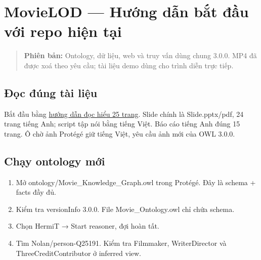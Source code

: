 \documentclass[
  11pt,
]{article}
\author{}
\date{}
\providecommand{\tightlist}{%
  \setlength{\itemsep}{0pt}\setlength{\parskip}{0pt}}
\begin{document}
\section{MovieLOD --- Hướng dẫn bắt đầu với repo hiện
tại}\label{movielod-hux1b0ux1edbng-dux1eabn-bux1eaft-ux111ux1ea7u-vux1edbi-repo-hiux1ec7n-tux1ea1i}

\begin{quote}
\textbf{Phiên bản:} Ontology, dữ liệu, web và truy vấn dùng chung 3.0.0.
MP4 đã được xoá theo yêu cầu; tài liệu demo dùng cho trình diễn trực
tiếp.
\end{quote}

\subsection{Đọc đúng tài
liệu}\label{ux111ux1ecdc-ux111uxfang-tuxe0i-liux1ec7u}

Bắt đầu bằng \href{Huong_dan_doc_hieu_project.pdf}{hướng dẫn đọc hiểu 25
trang}. Slide chính là
Slide.\allowbreak{}pp\allowbreak{}tx/\allowbreak{}pdf, 24 trang tiếng
Anh; script tập nói bằng tiếng Việt. Báo cáo tiếng Anh đúng 15 trang. Ô
chờ ảnh Protégé giữ tiếng Việt, yêu cầu ảnh mới của OWL 3.0.0.

\subsection{Chạy ontology mới}\label{chux1ea1y-ontology-mux1edbi}

\begin{enumerate}
\def\labelenumi{\arabic{enumi}.}
\tightlist
\item
  Mở
  ontology\allowbreak{}/\allowbreak{}\allowbreak{}Movie\_\allowbreak{}\allowbreak{}K\allowbreak{}nowledge\allowbreak{}\_\allowbreak{}\allowbreak{}Graph.\allowbreak{}o\allowbreak{}wl
  trong Protégé. Đây là schema + facts đầy đủ.
\item
  Kiểm tra versionInfo 3.0.0. File
  Movie\_\allowbreak{}\allowbreak{}On\allowbreak{}tology.\allowbreak{}o\allowbreak{}wl
  chỉ chứa schema.
\item
  Chọn HermiT → Start reasoner, đợi hoàn tất.
\item
  Tìm
  Nolan/\allowbreak{}pe\allowbreak{}rson-\allowbreak{}\allowbreak{}Q25\allowbreak{}191.\allowbreak{}
  Kiểm tra Filmmaker, Writer\allowbreak{}Di\allowbreak{}rector và
  Three\allowbreak{}Cre\allowbreak{}dit\allowbreak{}Contr\allowbreak{}ibutor
  ở inferred view.
\end{enumerate}
\end{document}

